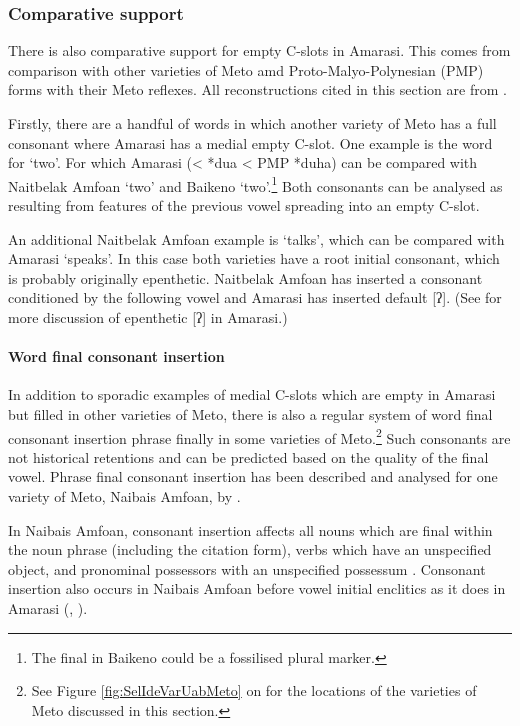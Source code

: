 \subsubsection{Comparative support}\label{sec:ComSup}
There is also comparative support for empty C-slots in Amarasi.
This comes from comparison with other varieties of Meto amd
Proto-Malyo-Polynesian (PMP) forms with their Meto reflexes.
All reconstructions cited in this section are from \citep{bltr}.

Firstly, there are a handful of words in which another variety of Meto
has a full consonant where Amarasi has a medial empty C-slot.
One example is the word for `two'.
For which Amarasi  (< *dua < PMP *duha) can
be compared with Naitbelak Amfo{\Q}an  `two' 
and Baikeno  `two'.\footnote{
		The final  in Baikeno  could be a fossilised plural marker.}
Both consonants can be analysed as resulting from features of the
previous vowel spreading into an empty C-slot.

An additional Naitbelak Amfo{\Q}an example is  `talks',
which can be compared with Amarasi  `speaks'.
In this case both varieties have a root initial consonant,
which is probably originally epenthetic.
Naitbelak Amfo{\Q}an has inserted a consonant conditioned
by the following vowel and Amarasi has inserted default [ʔ].
(See  for more discussion of epenthetic [ʔ] in Amarasi.)

\paragraph{Word final consonant insertion}\label{sec:WorFinConIns}
In addition to sporadic examples of medial C-slots which are empty in Amarasi
but filled in other varieties of Meto,
there is also a regular system of word final consonant insertion
phrase finally in some varieties of Meto.\footnote{
		See Figure \ref{fig:SelIdeVarUabMeto} on 
		for the locations of the varieties of Meto discussed in this section.}
Such consonants are not historical retentions
and can be predicted based on the quality of the final vowel.
Phrase final consonant insertion has been described
and analysed for one variety of Meto, Nai{\Q}bais Amfo{\Q}an, by \citet{cu18}.

In Nai{\Q}bais Amfo{\Q}an, consonant insertion affects
all nouns which are final within the noun phrase (including the citation form),
verbs which have an unspecified object, and pronominal possessors
with an unspecified possessum \citep[31ff]{cu18}.
Consonant insertion also occurs in Nai{\Q}bais Amfo{\Q}an
before vowel initial enclitics as it does in Amarasi
(, ).

